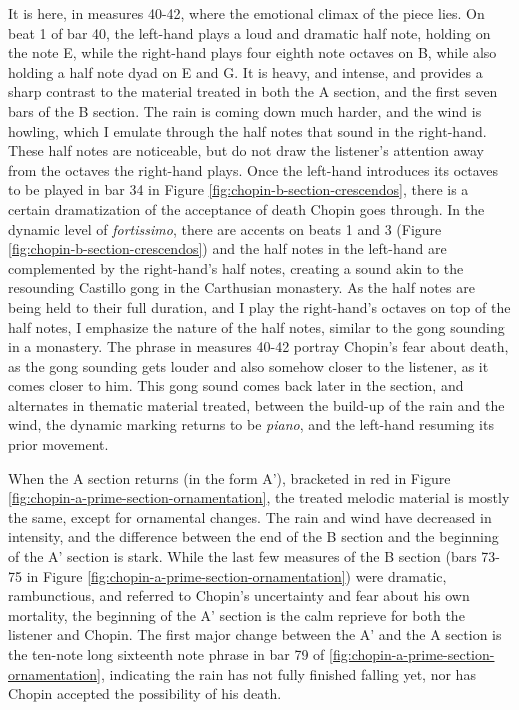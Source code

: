 It is here, in measures 40-42, where the emotional climax of the piece lies. On beat 1 of bar 40, the left-hand plays a loud and dramatic half note, holding on the note E, while the right-hand plays four eighth note octaves on B, while also holding a half note dyad on E and G\musSharp{}. It is heavy, and intense, and provides a sharp contrast to the material treated in both the A  section, and the first seven bars of the B section. The rain is coming down much harder, and the wind is howling, which I emulate through the half notes that sound in the right-hand. These half notes are noticeable, but do not draw the listener's attention away from the octaves the right-hand plays. Once the left-hand introduces its octaves to be played in bar 34 in Figure \ref{fig:chopin-b-section-crescendos}\autocite{Hansen_1973}, there is a certain dramatization of the acceptance of death Chopin goes through. In the dynamic level of \textit{fortissimo}, there are accents on beats 1 and 3 (Figure \ref{fig:chopin-b-section-crescendos}\autocite{Hansen_1973}) and the half notes in the left-hand are complemented by the right-hand's half notes, creating a sound akin to the resounding Castillo gong in the Carthusian monastery. As the half notes are being held to their full duration, and I play the right-hand's octaves on top of the half notes, I emphasize the nature of the half notes, similar to the gong sounding in a monastery. The phrase in measures 40-42 portray Chopin's fear about death, as the gong sounding gets louder and also somehow closer to the listener, as it comes closer to him. This gong sound comes back later in the section, and alternates in thematic material treated, between the build-up of the rain and the wind, the dynamic marking returns to be \textit{piano}, and the left-hand resuming its prior movement. 

When the A section returns (in the form A'), bracketed in red in Figure \ref{fig:chopin-a-prime-section-ornamentation}\autocite{Hansen_1973}, the treated melodic material is mostly the same, except for ornamental changes. The rain and wind have decreased in intensity, and the difference between the end of the B section and the beginning of the A' section is stark. While the last few measures of the B section (bars 73-75 in Figure \ref{fig:chopin-a-prime-section-ornamentation}\autocite{Hansen_1973}) were dramatic, rambunctious, and referred to Chopin's uncertainty and fear about his own mortality, the beginning of the A' section is the calm reprieve for both the listener and Chopin. The first major change between the A' and the A section is the ten-note long sixteenth note phrase in bar 79 of  \ref{fig:chopin-a-prime-section-ornamentation}\autocite{Hansen_1973}, indicating the rain has not fully finished falling yet, nor has Chopin accepted the possibility of his death. 

